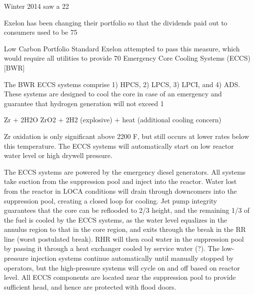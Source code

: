 \documentclass[10pt]{article}
\begin{document}
Winter 2014 saw a 22%

Exelon has been changing their portfolio so that the dividends paid out to consumers used to be 75%

Low Carbon Portfolio Standard
Exelon attempted to pass this measure, which would require all utilities to provide 70%
Emergency Core Cooling Systems (ECCS) [BWR]

The BWR ECCS systems comprise 1) HPCS, 2) LPCS, 3) LPCI, and 4) ADS. These systems are designed to cool the core in case of an emergency and guarantee that hydrogen generation will not exceed 1%

Zr + 2H2O  ZrO2 + 2H2 (explosive) + heat (additional cooling concern)

Zr oxidation is only significant above 2200 F, but still occurs at lower rates below this temperature. The ECCS systems will automatically start on low reactor water level or high drywell pressure. 

The ECCS systems are powered by the emergency diesel generators. All systems take suction from the suppression pool and inject into the reactor. Water lost from the reactor in LOCA conditions will drain through downcomers into the suppression pool, creating a closed loop for cooling. Jet pump integrity guarantees that the core can be reflooded to 2/3 height, and the remaining 1/3 of the fuel is cooled by the ECCS systems, as the water level equalizes in the annulus region to that in the core region, and exits through the break in the RR line (worst postulated break). RHR will then cool water in the suppression pool by passing it through a heat exchanger cooled by service water (?). The low-pressure injection systems continue automatically until manually stopped by operators, but the high-pressure systems will cycle on and off based on reactor level. All ECCS components are located near the suppression pool to provide sufficient head, and hence are protected with flood doors. 
\end{document}
